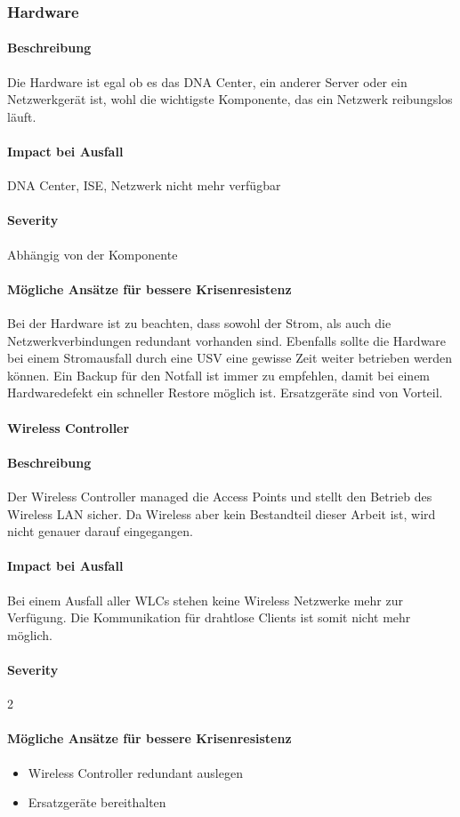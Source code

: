 \subsubsection{Hardware}
\paragraph{Beschreibung}
Die Hardware ist egal ob es das DNA Center, ein anderer Server oder ein Netzwerkgerät ist, wohl die wichtigste Komponente, das ein Netzwerk reibungslos läuft.

\paragraph{Impact bei Ausfall}
DNA Center, ISE, Netzwerk nicht mehr verfügbar

\paragraph{Severity} Abhängig von der Komponente

\paragraph{Mögliche Ansätze für bessere Krisenresistenz}
Bei der Hardware ist zu beachten, dass sowohl der Strom, als auch die Netzwerkverbindungen redundant vorhanden sind. Ebenfalls sollte die Hardware bei einem Stromausfall durch eine USV eine gewisse Zeit weiter betrieben werden können. Ein Backup für den Notfall ist immer zu empfehlen, damit bei einem Hardwaredefekt ein schneller Restore möglich ist.
Ersatzgeräte sind von Vorteil.

\paragraph{Wireless Controller}
\paragraph{Beschreibung}
Der Wireless Controller managed die Access Points und stellt den Betrieb des Wireless LAN sicher. Da Wireless aber kein Bestandteil dieser Arbeit ist, wird nicht genauer darauf eingegangen.

\paragraph{Impact bei Ausfall}
Bei einem Ausfall aller WLCs stehen keine Wireless Netzwerke mehr zur Verfügung. Die Kommunikation für drahtlose Clients ist somit nicht mehr möglich.

\paragraph{Severity} 2

\paragraph{Mögliche Ansätze für bessere Krisenresistenz}
\begin{itemize}
	\item Wireless Controller redundant auslegen
	\item Ersatzgeräte bereithalten
\end{itemize}
